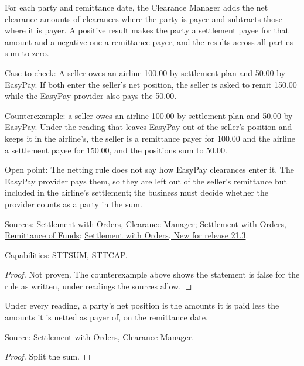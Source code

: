 \begin{theorem}
  \label{thm:accounting-net-position}
  For each party and remittance date, the Clearance Manager adds the net
  clearance amounts of clearances where the party is payee and subtracts
  those where it is payer. A positive result makes the party a settlement
  payee for that amount and a negative one a remittance payer, and the
  results across all parties sum to zero.

  Case to check: A seller owes an airline 100.00 by settlement plan and
  50.00 by EasyPay. If both enter the seller's net position, the seller is
  asked to remit 150.00 while the EasyPay provider also pays the 50.00.

  Counterexample: a seller owes an airline 100.00 by settlement plan and
  50.00 by EasyPay.  Under the reading that leaves EasyPay out of the
  seller's position and keeps it in the airline's, the seller is a
  remittance payer for 100.00 and the airline a settlement payee for 150.00,
  and the positions sum to 50.00.

  Open point: The netting rule does not say how EasyPay clearances enter it.
  The EasyPay provider pays them, so they are left out of the seller's
  remittance but included in the airline's settlement; the business must
  decide whether the provider counts as a party in the sum.

  Sources: \href{https://standards.atlassian.net/wiki/spaces/SWO/pages/574259794}{Settlement with Orders, Clearance Manager};
  \href{https://standards.atlassian.net/wiki/spaces/SWO/pages/574718145}{Settlement with Orders, Remittance of Funds};
  \href{https://standards.atlassian.net/wiki/spaces/SWO/pages/574488802}{Settlement with Orders, New for release 21.3}.

  Capabilities: STTSUM, STTCAP.
\end{theorem}
\begin{proof}
  Not proven.  The counterexample above shows the statement is false for
  the rule as written, under readings the sources allow.
\end{proof}

\begin{theorem}
  \label{thm:accounting-net-position-formula}
  Under every reading, a party's net position is the amounts it is paid
  less the amounts it is netted as payer of, on the remittance date.

  Source: \href{https://standards.atlassian.net/wiki/spaces/SWO/pages/574259794}{Settlement with Orders, Clearance Manager}.
\end{theorem}
\begin{proof}
  Split the sum.
\end{proof}

